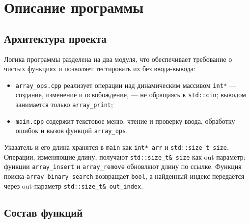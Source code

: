\section{Описание программы}

\subsection{Архитектура проекта}

Логика программы разделена на два модуля, что обеспечивает требование о чистых
функциях и позволяет тестировать их без ввода-вывода:

\begin{itemize}
  \item \texttt{array\_ops.cpp} реализует операции над динамическим массивом
        \texttt{int*} --- создание, изменение и освобождение, --- не обращаясь
        к \texttt{std::cin}; выводом занимается только \texttt{array\_print};
  \item \texttt{main.cpp} содержит текстовое меню, чтение и проверку ввода,
        обработку ошибок и вызов функций \texttt{array\_ops}.
\end{itemize}

Указатель и его длина хранятся в \texttt{main} как \texttt{int* arr} и
\texttt{std::size\_t size}. Операции, изменяющие длину, получают
\texttt{std::size\_t\& size} как out-параметр: функции
\texttt{array\_insert} и \texttt{array\_remove} обновляют длину по ссылке.
Функция поиска \texttt{array\_binary\_search} возвращает \texttt{bool}, а
найденный индекс передаётся через out-параметр
\texttt{std::size\_t\& out\_index}.

\subsection{Состав функций}

